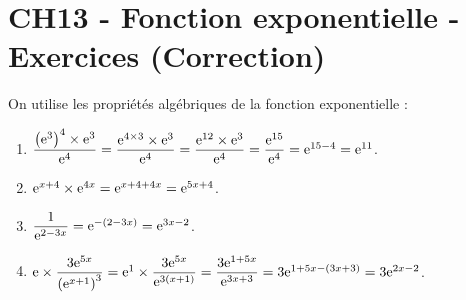\documentclass[a4paper,11pt]{article}
\author{Pierquet}
\title{\nomfichier}
\begin{document}
\pagestyle{fancy}

\part{CH13 - Fonction exponentielle - Exercices (Correction)}


\medskip

On utilise les propriétés algébriques de la fonction exponentielle :
\begin{enumerate}
	\item $\dfrac{\left({\rm e}^3\right)^4 \times {\rm e}^3}{{\rm e}^4} = \dfrac{{\rm e}^{4 \times 3} \times {\rm e}^3}{{\rm e}^4} = \dfrac{{\rm e}^{12} \times {\rm e}^3}{{\rm e}^4} = \dfrac{{\rm e}^{15}}{{\rm e}^4}={\rm e}^{15-4}={\rm e}^{11}$.
	\item ${\rm e}^{x+4} \times {\rm e}^{4x} = {\rm e}^{x+4+4x}={\rm e}^{5x+4}$.
	\item $\dfrac{1}{{\rm e}^{2-3x}} = {\rm e}^{-(2-3x)}= {\rm e}^{3x-2}$.
	\item ${\rm e} \times \dfrac{3{\rm e}^{5x}}{\left({\rm e}^{x+1}\right)^3} = {\rm e}^1 \times \dfrac{3{\rm e}^{5x}}{{\rm e}^{3(x+1)}} = \dfrac{3{\rm e}^{1+5x}}{{\rm e}^{3x+3}} = 3{\rm e}^{1+5x-(3x+3)} = 3 {\rm e}^{2x-2}$.
\end{enumerate}

\medskip

\end{document}
